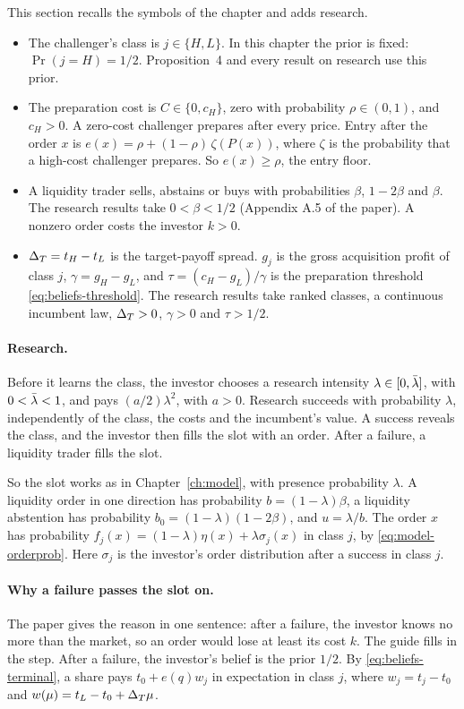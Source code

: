 This section recalls the symbols of the chapter and adds research.
\begin{itemize}
\item The challenger's class is \(j\in\{H,L\}\). In this chapter the prior is fixed: \(\Pr(j=H)=1/2\).
Proposition~4 and every result on research use this prior.
\item The preparation cost is \(C\in\{0,c_H\}\), zero with probability \(\rho\in(0,1)\), and \(c_H>0\). A zero-cost
challenger prepares after every price. Entry after the order \(x\) is \(e(x)=\rho+(1-\rho)\,\zeta(P(x))\), where
\(\zeta\) is the probability that a high-cost challenger prepares. So \(e(x)\ge\rho\), the entry floor.
\item A liquidity trader sells, abstains or buys with probabilities \(\beta\), \(1-2\beta\) and \(\beta\). The
research results take \(0<\beta<1/2\) (Appendix A.5 of the paper). A nonzero order costs the investor \(k>0\).
\item \(\Delta_T=t_H-t_L\) is the target-payoff spread. \(g_j\) is the gross acquisition profit of class \(j\),
\(\gamma=g_H-g_L\), and \(\tau=(c_H-g_L)/\gamma\) is the preparation threshold \eqref{eq:beliefs-threshold}. The
research results take ranked classes, a continuous incumbent law, \(\Delta_T>0\), \(\gamma>0\) and \(\tau>1/2\).
\end{itemize}

\paragraph{Research.} Before it learns the class, the investor chooses a research intensity
\(\lambda\in[0,\bar\lambda]\), with \(0<\bar\lambda<1\), and pays \((a/2)\lambda^2\), with \(a>0\). Research succeeds with probability
\(\lambda\), independently of the class, the costs and the incumbent's value. A success reveals the class, and the
investor then fills the slot with an order. After a failure, a liquidity trader fills the slot.

So the slot works as in Chapter~\ref{ch:model}, with presence probability \(\lambda\). A liquidity order in one
direction has probability \(b=(1-\lambda)\beta\), a liquidity abstention has probability
\(b_0=(1-\lambda)(1-2\beta)\), and \(u=\lambda/b\). The order \(x\) has probability
\(f_j(x)=(1-\lambda)\eta(x)+\lambda\sigma_j(x)\) in class \(j\), by \eqref{eq:model-orderprob}. Here \(\sigma_j\) is
the investor's order distribution after a success in class \(j\).

\paragraph{Why a failure passes the slot on.} The paper gives the reason in one sentence: after a failure, the
investor knows no more than the market, so an order would lose at least its cost \(k\). The guide fills in the step.
After a failure, the investor's belief is the prior \(1/2\). By \eqref{eq:beliefs-terminal}, a share pays
\(t_0+e(q)w_j\) in expectation in class \(j\), where \(w_j=t_j-t_0\) and \(w(\mu)=t_L-t_0+\Delta_T\mu\).

